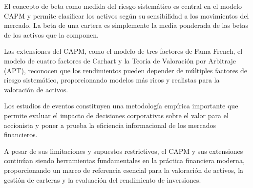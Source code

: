 El concepto de beta como medida del riesgo sistemático es central en el modelo CAPM y permite clasificar los activos según su sensibilidad a los movimientos del mercado. La beta de una cartera es simplemente la media ponderada de las betas de los activos que la componen.

Las extensiones del CAPM, como el modelo de tres factores de Fama-French, el modelo de cuatro factores de Carhart y la Teoría de Valoración por Arbitraje (APT), reconocen que los rendimientos pueden depender de múltiples factores de riesgo sistemático, proporcionando modelos más ricos y realistas para la valoración de activos.

Los estudios de eventos constituyen una metodología empírica importante que permite evaluar el impacto de decisiones corporativas sobre el valor para el accionista y poner a prueba la eficiencia informacional de los mercados financieros.

A pesar de sus limitaciones y supuestos restrictivos, el CAPM y sus extensiones continúan siendo herramientas fundamentales en la práctica financiera moderna, proporcionando un marco de referencia esencial para la valoración de activos, la gestión de carteras y la evaluación del rendimiento de inversiones.



